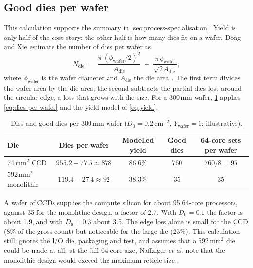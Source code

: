 \subsection{Good dies per wafer}
\label{app:dies-per-wafer}
This calculation supports the summary in \cref{sec:process-specialisation}. Yield is only half of the cost story; the other half is how many dies fit on a wafer. Dong and Xie estimate the number of dies per wafer as
\begin{equation}
  N_{\mathrm{die}} \;=\; \frac{\pi\,(\phi_{\mathrm{wafer}}/2)^2}{A_{\mathrm{die}}} \;-\; \frac{\pi\,\phi_{\mathrm{wafer}}}{\sqrt{2\,A_{\mathrm{die}}}},
  \label{eq:dies-per-wafer}
\end{equation}
where $\phi_{\mathrm{wafer}}$ is the wafer diameter and $A_{\mathrm{die}}$ the die area \cite[Eq.~14]{dongSystemlevelCostAnalysis2009}. The first term divides the wafer area by the die area; the second subtracts the partial dies lost around the circular edge, a loss that grows with die size. For a 300\,mm wafer, \cref{tab:dies-per-wafer} applies \cref{eq:dies-per-wafer} and the yield model of \cref{eq:yield}.

\begin{table}[htbp]
  \centering
  \caption[Dies and good dies per 300\,mm wafer]{Dies and good dies per 300\,mm wafer ($D_0 = 0.2$\,cm$^{-2}$, $Y_{\mathrm{wafer}} = 1$; illustrative).}
  \label{tab:dies-per-wafer}
  \small
  \begin{tabular}{@{}lcccc@{}}
    \toprule
    \textbf{Die} & \textbf{Dies per wafer} & \textbf{Modelled yield} & \textbf{Good dies} & \textbf{64-core sets per wafer} \\
    \midrule
    74\,mm$^2$ CCD & $955.2 - 77.5 \approx 878$ & 86.6\% & 760 & $760/8 = 95$ \\
    592\,mm$^2$ monolithic & $119.4 - 27.4 \approx 92$ & 38.3\% & 35 & 35 \\
    \bottomrule
  \end{tabular}
\end{table}

A wafer of CCDs supplies the compute silicon for about 95 64-core processors, against 35 for the monolithic design, a factor of 2.7. With $D_0 = 0.1$ the factor is about 1.9, and with $D_0 = 0.3$ about 3.5. The edge loss alone is small for the CCD (8\% of the gross count) but noticeable for the large die (23\%). This calculation still ignores the I/O die, packaging and test, and assumes that a 592\,mm$^2$ die could be made at all; at the full 64-core size, Naffziger \emph{et al.} note that the monolithic design would exceed the maximum reticle size \cite{naffziger2020chiplet}.
